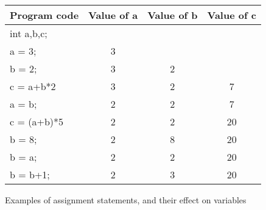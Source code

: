 




\begin {figure}


\begin{tabular} {l c c c}
Program code   &    Value of a & Value of b & Value of c \\
\hline
int a,b,c; 	&	      &  &			 \\
a = 3; 		& 3	&	& 	 		\\
b = 2; 		& 3	& 2	& 	 		\\
c = a+b*2 	& 3	& 2	& 7			\\
a = b;    	& 2	& 2	& 7			\\
c = (a+b)*5 	& 2	& 2	& 20 	 		\\
b = 8;      	& 2	& 8	& 20 	 		\\
b = a;      	& 2	& 2	& 20 	 		\\
b = b+1;      	& 2	& 3	& 20 	 		\\
\end {tabular}

\caption {Examples of assignment statements, and
their effect on variables}
\label {fig:stmts}

\end {figure}


